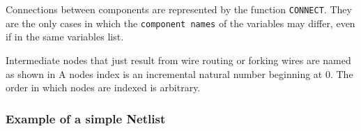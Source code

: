 Connections between components are represented by the function \texttt{CONNECT}. They are the only cases in which the \texttt{component names} of the variables may differ, even if in the same variables list.

Intermediate nodes that just result from wire routing or forking wires are named as shown in %
A nodes index is an incremental natural number beginning at $0$.
The order in which nodes are indexed is arbitrary.

\subsubsection{Example of a simple Netlist}